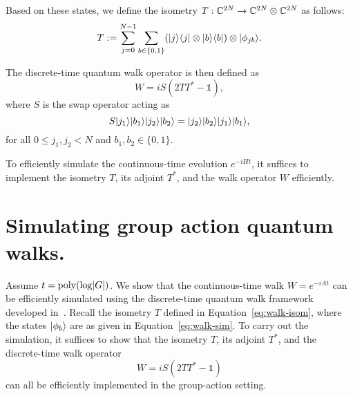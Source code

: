 \documentclass[12pt]{report}
\begin{document}
Based on these states, we define the isometry \( T : \mathbb{C}^{2N} \to \mathbb{C}^{2N} \otimes \mathbb{C}^{2N} \) as follows:
\begin{equation}
    \label{eq:walk-isom}
    T := \sum_{j = 0}^{N - 1} \sum_{b \in \{0, 1\}} (\lvert j\rangle\langle j\rvert \otimes \lvert b\rangle\langle b\rvert) \otimes \lvert\phi_{jb}\rangle.
\end{equation}

The discrete-time quantum walk operator is then defined as
\[
W = iS(2TT^* - \mathds{1}),
\]
where \( S \) is the swap operator acting as
\[
S \lvert j_1\rangle \lvert b_1\rangle \lvert j_2\rangle \lvert b_2\rangle = \lvert j_2\rangle \lvert b_2\rangle \lvert j_1\rangle \lvert b_1\rangle,
\]
for all \( 0 \le j_1, j_2 < N \) and \( b_1, b_2 \in \{0, 1\} \).

To efficiently simulate the continuous-time evolution \( e^{-iHt} \), it suffices to implement the isometry \( T \), its adjoint \( T^* \), and the walk operator \( W \) efficiently.








\section{Simulating group action quantum walks.}
Assume \( t = \operatorname{poly}(\log \lvert G\rvert) \). We show that the continuous-time walk \( W = e^{-iAt} \) can be efficiently simulated using the discrete-time quantum walk framework developed in~\cite{childs2010relationship}. Recall the isometry \( T \) defined in Equation~\eqref{eq:walk-isom}, where the states \( \lvert\phi_b\rangle \) are as given in Equation~\eqref{eq:walk-sim}. To carry out the simulation, it suffices to show that the isometry \( T \), its adjoint \( T^* \), and the discrete-time walk operator
\[
W = iS(2TT^* - \mathds{1})
\]
can all be efficiently implemented in the group-action setting.
\end{document}
